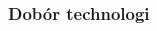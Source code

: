 \documentclass[aspectratio=169]{beamer}
\begin{document}
\begin{frame}
    \frametitle{Dobór technologi} %
    
    \begin{columns}
        \begin{column}{0.33\textwidth}
            \begin{figure}
                \centering
            \end{figure}
            \begin{figure}
            \centering
            \end{figure}
            \begin{figure}
            \centering

\end{figure}
\end{column}
\end{columns}
\end{frame}
\end{document}
